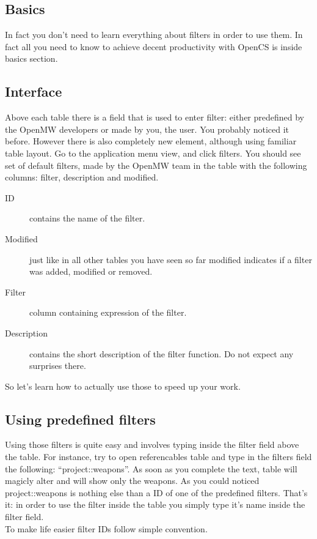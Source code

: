 \subsection{Basics}
In fact you don't need to learn everything about filters in order to use them. In fact all you need to know to achieve decent productivity with OpenCS is inside basics section.

\subsection{Interface}
Above each table there is a field that is used to enter filter: either predefined by the OpenMW developers or made by you, the user. You probably noticed it before. However there is also completely new element, although using familiar table layout. Go to the application menu view, and click filters. You should see set of default filters, made by the OpenMW team in the table with the following columns: filter, description and modified.

\begin{description}
 \item[ID] contains the name of the filter.
 \item[Modified] just like in all other tables you have seen so far modified indicates if a filter was added, modified or removed.
 \item[Filter] column containing expression of the filter.
 \item[Description] contains the short description of the filter function. Do not expect any surprises there.
\end{description}

So let's learn how to actually use those to speed up your work.
\subsection{Using predefined filters}
Using those filters is quite easy and involves typing inside the filter field above the table. For instance, try to open referencables table and type in the filters field the following: ``project::weapons''. As soon as you complete the text, table will magicly alter and will show only the weapons. As you could noticed project::weapons is nothing else than a ID of one of the predefined filters. That's it: in order to use the filter inside the table you simply type it's name inside the filter field.\\
To make life easier filter IDs follow simple convention. 

